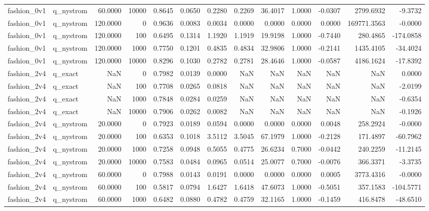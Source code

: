 \begin{table}
\begin{tabular}{llrrrrrrrrrrr}
fashion\_0v1 & q\_nystrom & 60.0000 & 10000 & 0.8645 & 0.0650 & 0.2280 & 0.2269 & 36.4017 & 1.0000 & -0.0307 & 2799.6932 & -9.3732 \\
fashion\_0v1 & q\_nystrom & 120.0000 & 0 & 0.9636 & 0.0083 & 0.0034 & 0.0000 & 0.0000 & 0.0000 & 0.0000 & 169771.3563 & -0.0000 \\
fashion\_0v1 & q\_nystrom & 120.0000 & 100 & 0.6495 & 0.1314 & 1.1920 & 1.1919 & 19.9198 & 1.0000 & -0.7440 & 280.4865 & -174.0858 \\
fashion\_0v1 & q\_nystrom & 120.0000 & 1000 & 0.7750 & 0.1201 & 0.4835 & 0.4834 & 32.9806 & 1.0000 & -0.2141 & 1435.4105 & -34.4024 \\
fashion\_0v1 & q\_nystrom & 120.0000 & 10000 & 0.8296 & 0.1030 & 0.2782 & 0.2781 & 28.4646 & 1.0000 & -0.0587 & 4186.1624 & -17.8392 \\
fashion\_2v4 & q\_exact & NaN & 0 & 0.7982 & 0.0139 & 0.0000 & NaN & NaN & NaN & NaN & NaN & 0.0000 \\
fashion\_2v4 & q\_exact & NaN & 100 & 0.7708 & 0.0265 & 0.0818 & NaN & NaN & NaN & NaN & NaN & -2.0199 \\
fashion\_2v4 & q\_exact & NaN & 1000 & 0.7848 & 0.0284 & 0.0259 & NaN & NaN & NaN & NaN & NaN & -0.6354 \\
fashion\_2v4 & q\_exact & NaN & 10000 & 0.7906 & 0.0262 & 0.0082 & NaN & NaN & NaN & NaN & NaN & -0.1926 \\
fashion\_2v4 & q\_nystrom & 20.0000 & 0 & 0.7923 & 0.0189 & 0.0594 & 0.0000 & 0.0000 & 0.0000 & 0.0048 & 258.2924 & -0.0000 \\
fashion\_2v4 & q\_nystrom & 20.0000 & 100 & 0.6353 & 0.1018 & 3.5112 & 3.5045 & 67.1979 & 1.0000 & -0.2128 & 171.4897 & -60.7962 \\
fashion\_2v4 & q\_nystrom & 20.0000 & 1000 & 0.7258 & 0.0948 & 0.5055 & 0.4775 & 26.6234 & 0.7000 & -0.0442 & 240.2259 & -11.2145 \\
fashion\_2v4 & q\_nystrom & 20.0000 & 10000 & 0.7583 & 0.0484 & 0.0965 & 0.0514 & 25.0077 & 0.7000 & -0.0076 & 366.3371 & -3.3735 \\
fashion\_2v4 & q\_nystrom & 60.0000 & 0 & 0.7988 & 0.0143 & 0.0191 & 0.0000 & 0.0000 & 0.0000 & 0.0005 & 3773.4316 & -0.0000 \\
fashion\_2v4 & q\_nystrom & 60.0000 & 100 & 0.5817 & 0.0794 & 1.6427 & 1.6418 & 47.6073 & 1.0000 & -0.5051 & 357.1583 & -104.5771 \\
fashion\_2v4 & q\_nystrom & 60.0000 & 1000 & 0.6482 & 0.0880 & 0.4782 & 0.4759 & 32.1165 & 1.0000 & -0.1459 & 416.8478 & -48.6510 \\

\end{tabular}
\end{table}
